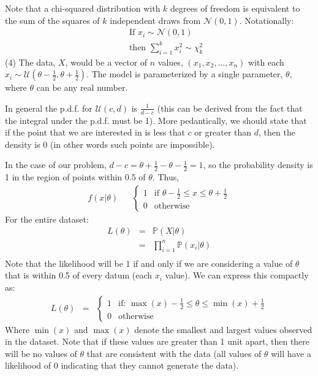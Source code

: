 \documentclass[11pt]{article}
\renewcommand{\Pr}{{\mathbb P}}
\begin{document}
Note that a chi-squared distribution with $k$ degrees of freedom is equivalent to the sum of the squares of $k$ independent draws from $\mathcal{N}(0,1)$.
Notationally:
\begin{eqnarray*}
	& & \mbox{If } x_i \sim  \mathcal{N}(0,1) \\
	& & \mbox{then }\sum_{i=1}^k x_i^2 \sim  \chi_k^2
\end{eqnarray*}
\newpage
(4) The data, $X$, would be a vector of $n$ values, $(x_1, x_2, \ldots, x_n)$ with each $x_i \sim \mathcal{U}(\theta-\frac{1}{2}, \theta+\frac{1}{2})$.
The model is parameterized by a single parameter, $\theta $, where $\theta$ can be any real number.

In general the p.d.f. for $\mathcal{U}(c,d)$ is $\frac{1}{d-c}$ (this can be derived from the fact that the integral under the p.d.f. must be 1).
More pedantically, we should state that if the point that we are interested in is less that $c$ or greater than $d$, then the density is 0 (in other words such points are impossible).\

In the case of our problem, $d-c = \theta+\frac{1}{2} - \theta-\frac{1}{2} = 1$, so the probability density is 1 in the region of points within 0.5 of $\theta$.
Thus,
\begin{eqnarray*}
	f(x|\theta) & & \left\{\begin{array}{cl}
 1 &  \mbox{if } \theta-\frac{1}{2} \leq x \leq \theta+\frac{1}{2} \\
 0 & \mbox{otherwise}
\end{array}
\right.
\end{eqnarray*}
For the entire dataset:
\begin{eqnarray*}
	L(\theta) & = &\Pr(X| \theta) \\
		& = & \prod_{i=1}^{n}\Pr(x_i| \theta)\\
\end{eqnarray*}
Note that the likelihood will be 1 if and only if we are considering a value of $\theta$ that is within 0.5 of every datum (each $x_i$ value).
We can express this compactly as:
\begin{eqnarray*}
	L(\theta) & = & \left\{\begin{array}{cl}
 1 &  \mbox{if: } \max(x)-\frac{1}{2} \leq \theta \leq \min({x})+\frac{1}{2} \\
 0 & \mbox{otherwise}
\end{array}
\right.
\end{eqnarray*}
Where $\min(x)$ and $\max(x)$ denote the smallest and largest values observed in the dataset. Note that if these values are greater than 1 unit apart, then there will be no values of $\theta$ that are consistent with the data (all values of $\theta$ will have a likelihood of 0 indicating that they cannot generate the data). 
\end{document}
